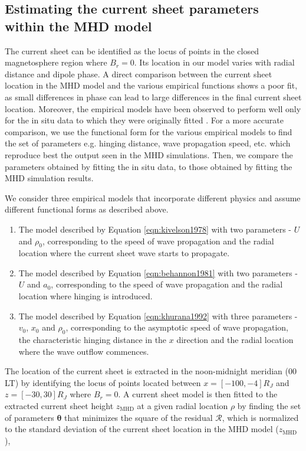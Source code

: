 \subsection{Estimating the current sheet parameters within the MHD model}
The current sheet can be identified as the locus of points in the closed magnetosphere region where $B_r=0$. Its location in our model varies with radial distance and dipole phase. A direct comparison between the current sheet location in the MHD model and the various empirical functions shows a poor fit, as small differences in phase can lead to large differences in the final current sheet location. Moreover, the empirical models have been observed to perform well only for the in situ data to which they were originally fitted \cite{Khurana1992a, Behannon1981}. For a more accurate comparison, we use the functional form for the various empirical models to find the set of parameters e.g. hinging distance, wave propagation speed, etc. which reproduce best the output seen in the MHD simulations. Then, we compare the parameters obtained by fitting the in situ data, to those obtained by fitting the MHD simulation results. 

We consider three empirical models that incorporate different physics and assume different functional forms as described above.
\begin{enumerate}
    \item The  model described by Equation \ref{eqn:kivelson1978} with two parameters - $U$ and $\rho_0$, corresponding to the speed of wave propagation and the radial location where the current sheet wave starts to propagate. 
    \item The  model described by Equation \ref{eqn:behannon1981} with two parameters - $U$ and $a_0$, corresponding to the speed of wave propagation and the radial location where hinging is introduced.
    \item The  model described by Equation \ref{eqn:khurana1992} with three parameters - $v_0$, $x_0$ and $\rho_0$, corresponding to the asymptotic speed of wave propagation, the characteristic hinging distance in the $x$ direction and the radial location where the wave outflow commences. 
\end{enumerate}

The location of the current sheet is extracted in the noon-midnight meridian (00 LT) by identifying the locus of points located between $x=[-100, -4] R_J$ and $z=[-30, 30] R_J$ where  $B_r=0$. A current sheet model is then fitted to the extracted current sheet height $z_\text{MHD}$ at a given radial location $\rho$ by finding the set of parameters $\boldsymbol\theta$ that minimizes the square of the residual $\mathcal{R}$, which is normalized to the standard deviation of the current sheet location in the MHD model ($z_\text{MHD}$),

